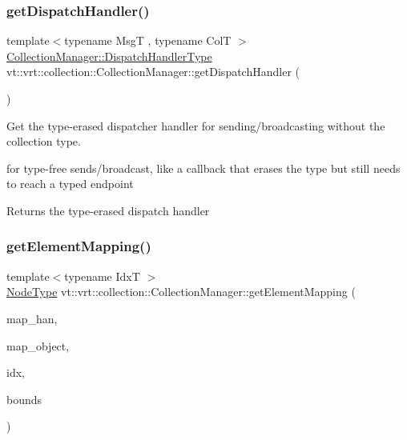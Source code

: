 \subsubsection{\texorpdfstring{get\+Dispatch\+Handler()}{getDispatchHandler()}}
{\footnotesize\ttfamily template$<$typename MsgT , typename ColT $>$ \\
\hyperlink{structvt_1_1vrt_1_1collection_1_1_collection_manager_a0cfe02a0426e95ec9daa2ef7374e07c7}{Collection\+Manager\+::\+Dispatch\+Handler\+Type} vt\+::vrt\+::collection\+::\+Collection\+Manager\+::get\+Dispatch\+Handler (\begin{DoxyParamCaption}{ }\end{DoxyParamCaption})}



Get the type-\/erased dispatcher handler for sending/broadcasting without the collection type. 

for type-\/free sends/broadcast, like a callback that erases the type but still needs to reach a typed endpoint

\begin{DoxyReturn}{Returns}
the type-\/erased dispatch handler 
\end{DoxyReturn}
\mbox{\label{structvt_1_1vrt_1_1collection_1_1_collection_manager_a899158015e2abd7d39eda2c7715e2632}} 
\subsubsection{\texorpdfstring{get\+Element\+Mapping()}{getElementMapping()}}
{\footnotesize\ttfamily template$<$typename IdxT $>$ \\
\hyperlink{namespacevt_a866da9d0efc19c0a1ce79e9e492f47e2}{Node\+Type} vt\+::vrt\+::collection\+::\+Collection\+Manager\+::get\+Element\+Mapping (\begin{DoxyParamCaption}\item[{\hyperlink{namespacevt_af64846b57dfcaf104da3ef6967917573}{Handler\+Type}}]{map\+\_\+han,  }\item[{\hyperlink{namespacevt_ad7cae989df485fccca57f0792a880a8e}{Obj\+Group\+Proxy\+Type}}]{map\+\_\+object,  }\item[{IdxT}]{idx,  }\item[{IdxT}]{bounds }\end{DoxyParamCaption})\hspace{0.3cm}{\ttfamily [private]}}



